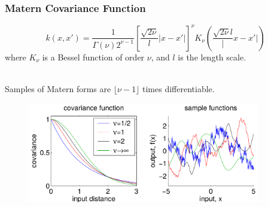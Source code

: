 \documentclass[10pt]{beamer}
\begin{document}
  \begin{frame}
    \frametitle{Matern Covariance Function}

    \begin{equation*}
      k(x,x') = \frac{1}{\Gamma(\nu) 2^{\nu - 1}} \left[ \frac{\sqrt{2 \nu}}{l} |x - x'| \right]^{\nu} K_{\nu} \left( \frac{\sqrt{2 \nu}{l}} |x - x'| \right)
    \end{equation*}
    where $K_{\nu}$ is a Bessel function of order $\nu$, and $l$ is the length scale.\\~

    Samples of Matern forms are $\lfloor \nu - 1 \rfloor$ times differentiable.

    \begin{figure}
      \centering
      \includegraphics[width=0.9\textwidth]{maternCovFunc.png}
    \end{figure}

  \end{frame}
\end{document}
